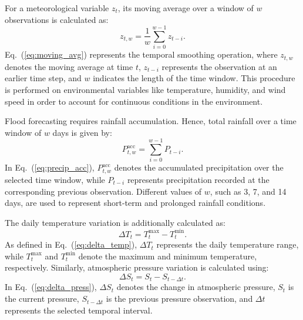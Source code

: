 \documentclass[conference]{IEEEtran}
\begin{document}
For a meteorological variable $z_t$, its moving average over a window of $w$ observations is calculated as:
\begin{equation}
z_{t,w} = \frac{1}{w} \sum_{i=0}^{w-1} z_{t-i}.
\label{eq:moving_avg}
\end{equation}
Eq.~(\ref{eq:moving_avg}) represents the temporal smoothing operation, where $z_{t,w}$ denotes the moving average at time $t$, $z_{t-i}$ represents the observation at an earlier time step, and $w$ indicates the length of the time window. This procedure is performed on environmental variables like temperature, humidity, and wind speed in order to account for continuous conditions in the environment.

Flood forecasting requires rainfall accumulation. Hence, total rainfall over a time window of $w$ days is given by:
\begin{equation}
P^{\text{acc}}_{t,w} = \sum_{i=0}^{w-1} P_{t-i}.
\label{eq:precip_acc}
\end{equation}
In Eq.~(\ref{eq:precip_acc}), $P^{\text{acc}}_{t,w}$ denotes the accumulated precipitation over the selected time window, while $P_{t-i}$ represents precipitation recorded at the corresponding previous observation. Different values of $w$, such as 3, 7, and 14 days, are used to represent short-term and prolonged rainfall conditions.

The daily temperature variation is additionally calculated as:
\begin{equation}
\Delta T_t = T^{\text{max}}_t - T^{\text{min}}_t.
\label{eq:delta_temp}
\end{equation}
As defined in Eq.~(\ref{eq:delta_temp}), $\Delta T_t$ represents the daily temperature range, while $T^{\text{max}}_t$ and $T^{\text{min}}_t$ denote the maximum and minimum temperature, respectively. Similarly, atmospheric pressure variation is calculated using:
\begin{equation}
\Delta S_t = S_t - S_{t-\Delta t}.
\label{eq:delta_press}
\end{equation}
In Eq.~(\ref{eq:delta_press}), $\Delta S_t$ denotes the change in atmospheric pressure, $S_t$ is the current pressure, $S_{t-\Delta t}$ is the previous pressure observation, and $\Delta t$ represents the selected temporal interval.
\end{document}
